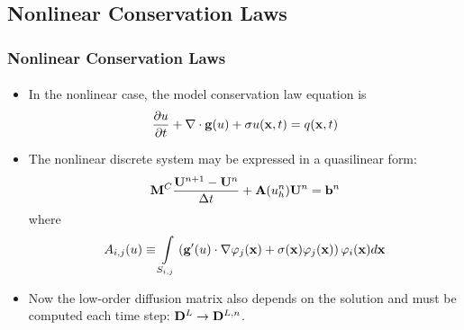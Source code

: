 \documentclass{beamer}
\begin{document}
\subsection{Nonlinear Conservation Laws}
\begin{frame}
\frametitle{Nonlinear Conservation Laws}
\framesubtitle{}

\begin{itemize}
   \item In the nonlinear case, the model conservation law equation is
      \begin{equation}
         \frac{\partial u}{\partial t} + \nabla\cdot\mathbf{g}(u) + \sigma u(\mathbf{x},t) = q(\mathbf{x},t)
      \end{equation}
   \item The nonlinear discrete system may be expressed in a quasilinear form:
      \begin{equation}
         \mathbf{M}^C\frac{\mathbf{U}^{n+1}-\mathbf{U}^n}{\Delta t} + \mathbf{A}(u_h^n)\mathbf{U}^n = \mathbf{b}^n
      \end{equation}
      where
      \begin{equation}
         A_{i,j}(u) \equiv \int\limits_{S_{i,j}}\left(
            \mathbf{g}'(u)\cdot\nabla\varphi_j(\mathbf{x}) +
            \sigma(\mathbf{x})\varphi_j(\mathbf{x})\right)\varphi_i(\mathbf{x}) d\mathbf{x}
      \end{equation}
   \item Now the low-order diffusion matrix also depends on the solution
      and must be computed each time step: $\mathbf{D}^L\rightarrow\mathbf{D}^{L,n}$.
\end{itemize}

\end{frame}
\end{document}
